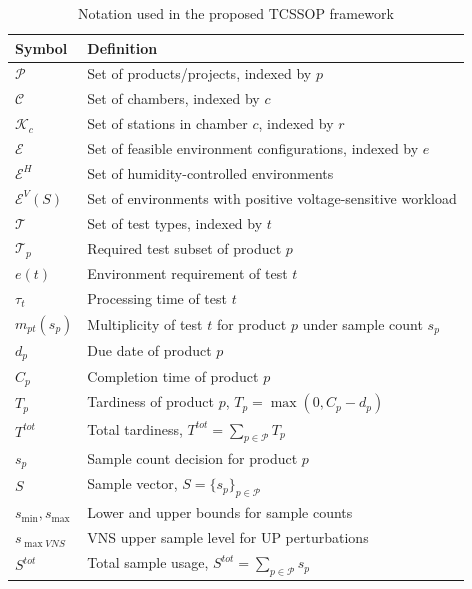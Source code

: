 \documentclass[11pt]{article}
\begin{document}
\begin{table}[H]
\centering
\caption{Notation used in the proposed TCSSOP framework}
\label{tab:notation_tcssop}
\small
\setlength{\tabcolsep}{3pt}
\renewcommand{\arraystretch}{0.9}
\begin{tabular}{|l|l|}
\hline
\textbf{Symbol} & \textbf{Definition} \\ \hline

\(\mathcal{P}\) & Set of products/projects, indexed by \(p\) \\ \hline
\(\mathcal{C}\) & Set of chambers, indexed by \(c\) \\ \hline
\(\mathcal{K}_c\) & Set of stations in chamber \(c\), indexed by \(r\) \\ \hline
\(\mathcal{E}\) & Set of feasible environment configurations, indexed by \(e\) \\ \hline
\(\mathcal{E}^{H}\) & Set of humidity-controlled environments \\ \hline
\(\mathcal{E}^{V}(S)\) & Set of environments with positive voltage-sensitive workload \\ \hline

\(\mathcal{T}\) & Set of test types, indexed by \(t\) \\ \hline
\(\mathcal{T}_p\) & Required test subset of product \(p\) \\ \hline
\(e(t)\) & Environment requirement of test \(t\) \\ \hline
\(\tau_t\) & Processing time of test \(t\) \\ \hline
\(m_{pt}(s_p)\) & Multiplicity of test \(t\) for product \(p\) under sample count \(s_p\) \\ \hline

\(d_p\) & Due date of product \(p\) \\ \hline
\(C_p\) & Completion time of product \(p\) \\ \hline
\(T_p\) & Tardiness of product \(p\), \(T_p=\max(0,C_p-d_p)\) \\ \hline
\(T^{tot}\) & Total tardiness, \(T^{tot}=\sum_{p\in\mathcal{P}}T_p\) \\ \hline

\(s_p\) & Sample count decision for product \(p\) \\ \hline
\(S\) & Sample vector, \(S=\{s_p\}_{p\in\mathcal{P}}\) \\ \hline
\(s_{\min},s_{\max}\) & Lower and upper bounds for sample counts \\ \hline
\(s_{\max VNS}\) & VNS upper sample level for UP perturbations \\ \hline
\(S^{tot}\) & Total sample usage, \(S^{tot}=\sum_{p\in\mathcal{P}}s_p\) \\ \hline


\end{tabular}
\end{table}
\end{document}
